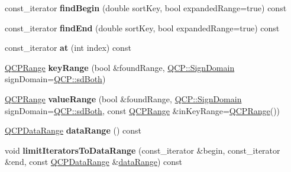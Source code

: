 \begin{DoxyCompactItemize}
\item 
const\+\_\+iterator {\bfseries find\+Begin} (double sort\+Key, bool expanded\+Range=true) const \hypertarget{class_q_c_p_data_container_a5758ac0474e4152dfdeb311240f45b0c}{}\label{class_q_c_p_data_container_a5758ac0474e4152dfdeb311240f45b0c}

\item 
const\+\_\+iterator {\bfseries find\+End} (double sort\+Key, bool expanded\+Range=true) const \hypertarget{class_q_c_p_data_container_aa1afeb1a48709390861bcc2356ac1d4f}{}\label{class_q_c_p_data_container_aa1afeb1a48709390861bcc2356ac1d4f}

\item 
const\+\_\+iterator {\bfseries at} (int index) const \hypertarget{class_q_c_p_data_container_a4651dee427680a381b84c4fa56115af8}{}\label{class_q_c_p_data_container_a4651dee427680a381b84c4fa56115af8}

\item 
\hyperlink{class_q_c_p_range}{Q\+C\+P\+Range} {\bfseries key\+Range} (bool \&found\+Range, \hyperlink{namespace_q_c_p_afd50e7cf431af385614987d8553ff8a9}{Q\+C\+P\+::\+Sign\+Domain} sign\+Domain=\hyperlink{namespace_q_c_p_afd50e7cf431af385614987d8553ff8a9a3dee7e9cd2fedce9253b83e172626a6c}{Q\+C\+P\+::sd\+Both})\hypertarget{class_q_c_p_data_container_aba6e1a93c21ccc56a432b4a02c9d0ed2}{}\label{class_q_c_p_data_container_aba6e1a93c21ccc56a432b4a02c9d0ed2}

\item 
\hyperlink{class_q_c_p_range}{Q\+C\+P\+Range} {\bfseries value\+Range} (bool \&found\+Range, \hyperlink{namespace_q_c_p_afd50e7cf431af385614987d8553ff8a9}{Q\+C\+P\+::\+Sign\+Domain} sign\+Domain=\hyperlink{namespace_q_c_p_afd50e7cf431af385614987d8553ff8a9a3dee7e9cd2fedce9253b83e172626a6c}{Q\+C\+P\+::sd\+Both}, const \hyperlink{class_q_c_p_range}{Q\+C\+P\+Range} \&in\+Key\+Range=\hyperlink{class_q_c_p_range}{Q\+C\+P\+Range}())\hypertarget{class_q_c_p_data_container_a35a102dc2424d1228fc374d9313efbe9}{}\label{class_q_c_p_data_container_a35a102dc2424d1228fc374d9313efbe9}

\item 
\hyperlink{class_q_c_p_data_range}{Q\+C\+P\+Data\+Range} {\bfseries data\+Range} () const \hypertarget{class_q_c_p_data_container_a0aa30487aa557b38c2e10f918454c085}{}\label{class_q_c_p_data_container_a0aa30487aa557b38c2e10f918454c085}

\item 
void {\bfseries limit\+Iterators\+To\+Data\+Range} (const\+\_\+iterator \&begin, const\+\_\+iterator \&end, const \hyperlink{class_q_c_p_data_range}{Q\+C\+P\+Data\+Range} \&\hyperlink{class_q_c_p_data_container_a0aa30487aa557b38c2e10f918454c085}{data\+Range}) const \hypertarget{class_q_c_p_data_container_ad55f9e9c95ab4414b477d2f08ffd9bd7}{}\label{class_q_c_p_data_container_ad55f9e9c95ab4414b477d2f08ffd9bd7}

\end{DoxyCompactItemize}
